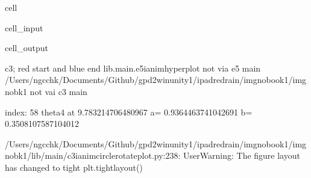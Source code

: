\documentclass[letterpaper,10pt,english]{jupyterBook}
\begin{document}
\begin{sphinxuseclass}{cell}\begin{sphinxVerbatimInput}

\begin{sphinxuseclass}{cell_input}
\begin{sphinxVerbatim}[commandchars=\\\{\}]
 
 
   
\end{sphinxVerbatim}

\end{sphinxuseclass}\end{sphinxVerbatimInput}
\begin{sphinxVerbatimOutput}

\begin{sphinxuseclass}{cell_output}
\begin{sphinxVerbatim}[commandchars=\\\{\}]
c3; red start and blue end
lib.main.e5\PYGZus{}i\PYGZus{}anim\PYGZus{}hyperplot
not via e5 main
/Users/ngcchk/Documents/Github/gpd2\PYGZhy{}win\PYGZhy{}unity1/ipadred\PYGZhy{}rain/imgno\PYGZus{}book1/imgnobk1
not vai c3 main

index: 58 
theta4 at  9.783214706480967 
 a= \PYGZhy{}0.9364463741042691  b= \PYGZhy{}0.3508107587104012 
\end{sphinxVerbatim}

\begin{sphinxVerbatim}[commandchars=\\\{\}]
/Users/ngcchk/Documents/Github/gpd2\PYGZhy{}win\PYGZhy{}unity1/ipadred\PYGZhy{}rain/imgno\PYGZus{}book1/imgnobk1/lib/main/c3\PYGZus{}i\PYGZus{}anim\PYGZus{}circle\PYGZus{}rotate\PYGZus{}plot.py:238: UserWarning: The figure layout has changed to tight
  plt.tight\PYGZus{}layout()
\end{sphinxVerbatim}

\noindent{}

\end{sphinxuseclass}\end{sphinxVerbatimOutput}

\end{sphinxuseclass}
\end{document}
